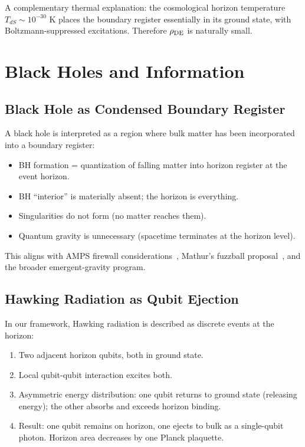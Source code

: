 \documentclass[11pt,a4paper]{article}
\begin{document}
A complementary thermal explanation: the cosmological horizon temperature $T_{dS} \sim 10^{-30}$ K places the boundary register essentially in its ground state, with Boltzmann-suppressed excitations. Therefore $\rho_{\rm DE}$ is naturally small.

\section{Black Holes and Information}
\label{sec:bh}

\subsection{Black Hole as Condensed Boundary Register}

A black hole is interpreted as a region where bulk matter has been incorporated into a boundary register:
\begin{itemize}[leftmargin=*]
\item BH formation = quantization of falling matter into horizon register at the event horizon.
\item BH ``interior'' is materially absent; the horizon is everything.
\item Singularities do not form (no matter reaches them).
\item Quantum gravity is unnecessary (spacetime terminates at the horizon level).
\end{itemize}

This aligns with AMPS firewall considerations~\cite{AMPS2013}, Mathur's fuzzball proposal~\cite{Mathur2005}, and the broader emergent-gravity program.

\subsection{Hawking Radiation as Qubit Ejection}

In our framework, Hawking radiation is described as discrete events at the horizon:
\begin{enumerate}[leftmargin=*]
\item Two adjacent horizon qubits, both in ground state.
\item Local qubit-qubit interaction excites both.
\item Asymmetric energy distribution: one qubit returns to ground state (releasing energy); the other absorbs and exceeds horizon binding.
\item Result: one qubit remains on horizon, one ejects to bulk as a single-qubit photon. Horizon area decreases by one Planck plaquette.
\end{enumerate}
\end{document}
